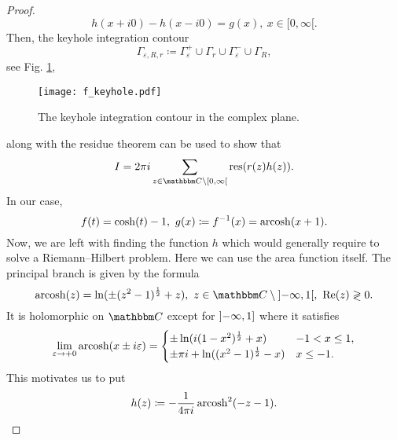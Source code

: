 \begin{proof}
\begin{equation*}
  h(x+i0) - h(x-i0) = g(x),\ x\in[0,\infty[ .
\end{equation*}
Then, the keyhole integration contour
\begin{equation*}
  \Gamma_{\varepsilon,R,r} \coloneqq \Gamma_\varepsilon^+ \cup \Gamma_r \cup \Gamma_\varepsilon^- \cup \Gamma_R ,
\end{equation*}
see Fig. \ref{f_keyhole},
\begin{figure}[bth]
\texttt{[image: f\_keyhole.pdf]}
\caption{The keyhole integration contour in the complex plane.}
\label{f_keyhole}
\end{figure}
along with the residue theorem can be used to show that
\begin{equation*}
  I = 2\pi i \sum_{z\in\C\setminus\interval[open right]{0}{\infty}} \res(r(z)h(z)) .
\end{equation*}
In our case,
\begin{equation*}
  f(t) = \cosh(t) - 1,\ 
  g(x)\coloneqq f^{-1}(x) = \arcosh(x+1) .
\end{equation*}
Now, we are left with finding the function $h$ which would generally
require to solve a Riemann--Hilbert problem. Here we can use
the area function itself. The principal branch is given by the formula
\begin{equation*}
  \arcosh(z) = \ln( \pm(z^2-1)^{\frac{1}{2}} + z),\ z\in\C\setminus\interval[open]{-\infty}{1},\ \re(z)\gtrless 0 .
\end{equation*}
It is holomorphic on $\C$ except for $\interval[open left]{-\infty}{1}$ where it satisfies
\begin{equation*}
  \lim_{\varepsilon\to+0} \operatorname{arcosh}(x\pm i\varepsilon) = 
\begin{cases}
  \pm\ln( i(1-x^2)^{\frac{1}{2}} + x )        & -1 < x \leq 1 ,\\
  \pm \pi i + \ln( (x^2-1)^{\frac{1}{2}} - x) & x\leq -1 .
\end{cases}
\end{equation*}
This motivates us to put
\begin{equation*}
  h(z) \coloneqq -\frac{1}{4\pi i} \arcosh^2(-z-1) .

\end{equation*}
\end{proof}
